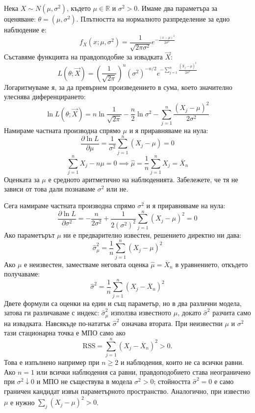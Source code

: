 \begin{example}\label{ex:12-2}

Нека $X \sim N(\mu, \sigma^2)$, където $\mu\in\mathbb R$ и $\sigma^2>0$.
Имаме два параметъра за оценяване: $\theta = (\mu, \sigma^2)$.
Плътността на нормалното разпределение за едно наблюдение е:
\[
    f_X(x; \mu, \sigma^2) = \frac{1}{\sqrt{2\pi\sigma^2}} e^{-\frac{(x - \mu)^2}{2\sigma^2}}
\]
Съставяме функцията на правдоподобие за извадката $\vec{X}$:
\[
    L(\theta;\vec{X}) = \left(\frac{1}{\sqrt{2\pi}}\right)^n (\sigma^2)^{-n/2} e^{-\sum_{j=1}^n \frac{(X_j - \mu)^2}{2\sigma^2}}
\]
Логаритмуваме я, за да превърнем произведението в сума, което значително улеснява диференцирането:
\[
    \ln L(\theta;\vec{X}) = n \ln \frac{1}{\sqrt{2\pi}} - \frac{n}{2} \ln \sigma^2 - \sum_{j=1}^n \frac{(X_j - \mu)^2}{2\sigma^2}
\]
Намираме частната производна спрямо $\mu$ и я приравняваме на нула:
\[
    \frac{\partial \ln L}{\partial \mu} = \frac{1}{\sigma^2} \sum_{j=1}^n (X_j - \mu) = 0
\]
\[
    \sum_{j=1}^n X_j - n\mu = 0 \implies \hat{\mu} = \frac{1}{n} \sum_{j=1}^n X_j = \overline{X}_n
\]
Оценката за $\mu$ е средното аритметично на наблюденията. Забележете, че тя не зависи от това дали познаваме $\sigma^2$ или не.

Сега намираме частната производна спрямо $\sigma^2$ и я приравняваме на нула:
\[
    \frac{\partial \ln L}{\partial \sigma^2} = -\frac{n}{2\sigma^2} + \frac{1}{2(\sigma^2)^2} \sum_{j=1}^n (X_j - \mu)^2 = 0
\]
Ако параметърът $\mu$ ни е предварително известен, решението директно ни дава:
\[
    \hat{\sigma}^2_{\mu} = \frac{1}{n} \sum_{j=1}^n (X_j - \mu)^2
\]
Ако $\mu$ е неизвестен, заместваме неговата оценка $\hat{\mu} = \overline{X}_n$ в уравнението, откъдето получаваме:
\[
    \hat{\sigma}^2 = \frac{1}{n} \sum_{j=1}^n (X_j - \overline{X}_n)^2
\]
Двете формули са оценки на един и същ параметър, но в два различни модела, затова ги
различаваме с индекс: $\hat{\sigma}^2_{\mu}$ използва известното $\mu$, докато
$\hat{\sigma}^2$ разчита само на извадката. Навсякъде по-нататък $\hat{\sigma}^2$ означава
втората. При неизвестни $\mu$ и $\sigma^2$ тази стационарна точка е МПО само ако
\[
    \mathrm{RSS}=\sum_{j=1}^n (X_j-\overline{X}_n)^2>0.
\]
Това е изпълнено например при $n\ge2$ и наблюдения, които не са всички равни.
Ако $n=1$ или всички наблюдения са равни, правдоподобието става неограничено
при $\sigma^2\downarrow0$ и МПО не съществува в модела $\sigma^2>0$; стойността
$\hat\sigma^2=0$ е само граничен кандидат извън параметърното пространство.
Аналогично, при известно $\mu$ е нужно $\sum_j(X_j-\mu)^2>0$.


\end{example}

